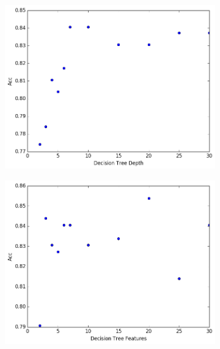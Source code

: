 \documentclass[11pt]{article}
\begin{document}
\begin{figure}[] 
\centering
    \begin{subfigure}[!t]{0.3\textwidth}
        \includegraphics[width=\textwidth]{Plots/DT_depth.png}
    \end{subfigure}
        \begin{subfigure}[!t]{0.3\textwidth}
        \includegraphics[width=\textwidth]{Plots/DT_feature.png}
    \end{subfigure}
            \begin{subfigure}[!t]{0.3\textwidth}

\end{subfigure}
\end{figure}
\end{document}
